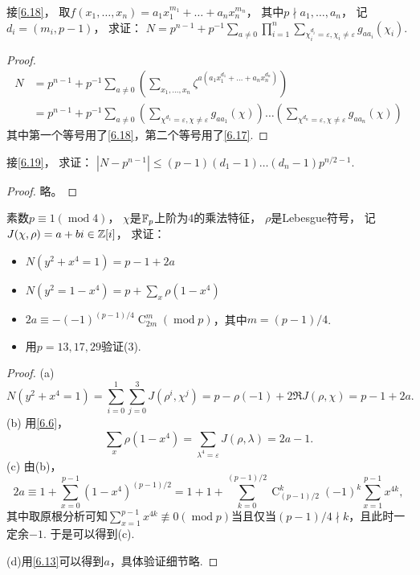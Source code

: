 \begin{exercise}\label{6.19}
 接\ref{6.18}，
 取$f(x_1,\ldots,x_n)=a_1x_1^{m_1}+\ldots+a_nx_n^{m_n}$，
 其中$p\nmid a_1,\ldots,a_n$，
 记$d_i=(m_i,p-1)$，
 求证：
 $N=p^{n-1}+p^{-1}\sum_{a\neq0}\prod_{i=1}^n\sum_{\chi_i^{d_i}=\varepsilon,\chi_i\neq\varepsilon}g_{aa_i}(\chi_i)$.
\end{exercise}
\begin{proof}
    \begin{align*}
        N
        &=p^{n-1}+p^{-1}\sum_{a\neq0}\left( 
    \sum_{x_1,\ldots,x_n}\zeta^{a(a_1x_1^{d_1}+\ldots+a_nx_n^{d_n})}
     \right)\\
     &=p^{n-1}+p^{-1}\sum_{a\neq0}
     \left( 
     \sum_{\chi^{d_1}=\varepsilon,\chi\neq\varepsilon}g_{aa_1}(\chi)
      \right)
      \ldots
      \left( 
     \sum_{\chi^{d_n}=\varepsilon,\chi\neq\varepsilon}g_{aa_n}(\chi)
      \right)
    \end{align*}
    其中第一个等号用了\ref{6.18}，第二个等号用了\ref{6.17}.
\end{proof}

\begin{exercise}\label{6.20}
    接\ref{6.19}，
    求证：
    $|N-p^{n-1}|\leqslant(p-1)(d_1-1)\ldots(d_n-1)p^{n/2-1}$.
\end{exercise}
\begin{proof}
    略。
\end{proof}

\begin{exercise}\label{6.21}
 素数$p\equiv1(\operatorname{mod}4)$，
 $\chi$是$\mathbb{F}_p$上阶为$4$的乘法特征，
 $\rho$是Lebesgue符号，
 记$J(\chi,\rho)=a+bi\in\mathbb{Z}[i]$，
 求证：
 \begin{itemize}
    \item[(1)] $N(y^2+x^4=1)=p-1+2a$
    \item[(2)] $N(y^2=1-x^4)=p+\sum_{x}\rho(1-x^4)$
    \item[(3)] $2a\equiv-(-1)^{(p-1)/4}\operatorname{C}_{2m}^{m}(\operatorname{mod}p)$，其中$m=(p-1)/4$.
    \item[(4)] 用$p=13,17,29$验证(3).
 \end{itemize}
\end{exercise}
\begin{proof}
    (a) \[N(y^2+x^4=1)=\sum_{i=0}^{1}\sum_{j=0}^{3}J(\rho^i,\chi^j)
    =p-\rho(-1)+2\Re J(\rho,\chi)=p-1+2a.\]
    (b) 用\ref{6.6}，\[\sum_{x}\rho(1-x^4)=\sum_{\lambda^4=\varepsilon}J(\rho,\lambda)=2a-1.\]
    (c) 由(b)，\[2a\equiv1+\sum_{x=0}^{p-1}(1-x^4)^{(p-1)/2}
    =1+1+\sum_{k=0}^{(p-1)/2}\operatorname{C}_{(p-1)/2}^k(-1)^k\sum_{x=1}^{p-1}x^{4k},\]
    其中取原根分析可知$\sum\limits_{x=1}^{p-1}x^{4k}\not\equiv0(\operatorname{mod}p)$当且仅当$(p-1)/4\nmid k$，且此时一定余$-1$.
    于是可以得到(c).

    (d)用\ref{6.13}可以得到$a$，具体验证细节略.
\end{proof}


